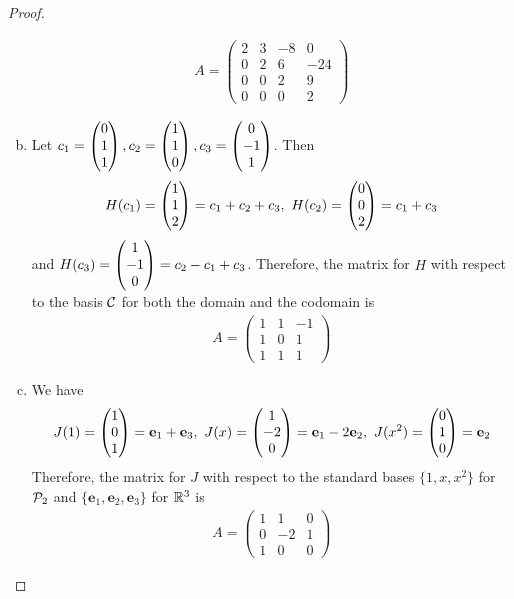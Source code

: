 \begin{proof}
\begin{enumerate}[(a)]
        \[
            \begin{aligned}
                A=\begin{pmatrix}
                    2 & 3 & -8 & 0\\
                    0 & 2 & 6 & -24\\
                    0 & 0 & 2 & 9\\
                    0 & 0 & 0 & 2
                \end{pmatrix}
            \end{aligned}
        \]
        \item Let $c_1=\ColVecThree{0}{1}{1},c_2=\ColVecThree{1}{1}{0},c_3=\ColVecThree{0}{-1}{1}$. Then 
        \[
            \begin{aligned}
                &H(c_1)=\ColVecThree{1}{1}{2}=c_1+c_2+c_3,\ H(c_2)=\ColVecThree{0}{0}{2}=c_1+c_3\\
            \end{aligned}
        \]
        and $H(c_3)=\ColVecThree{1}{-1}{0}=c_2-c_1+c_3$. Therefore, the matrix for $H$ with respect to the basis $\C$ for both the domain and the codomain is 
        \[
            \begin{aligned}
                A=\begin{pmatrix}
                    1 & 1 & -1\\
                    1 & 0 & 1\\
                    1 & 1 & 1
                \end{pmatrix}
            \end{aligned}
        \]
        \item We have
        \[
            \begin{aligned}
                J(1)=\ColVecThree{1}{0}{1}=\textbf{e}_1+\textbf{e}_3,\
                J(x)=\ColVecThree{1}{-2}{0}=\textbf{e}_1-2\textbf{e}_2,\
                J(x^2)=\ColVecThree{0}{1}{0}=\textbf{e}_2
            \end{aligned}
        \]
        Therefore, the matrix for $J$ with respect to the standard bases $\{1,x,x^2\}$ for $\P_2$ and $\{\textbf{e}_1,\textbf{e}_2,\textbf{e}_3\}$ for $\R^3$ is 
        \[
            \begin{aligned}
                A=\begin{pmatrix}
                    1 & 1 & 0\\
                    0 & -2 & 1\\
                    1 & 0 & 0
                \end{pmatrix}

\end{aligned}\]
\end{enumerate}
\end{proof}
